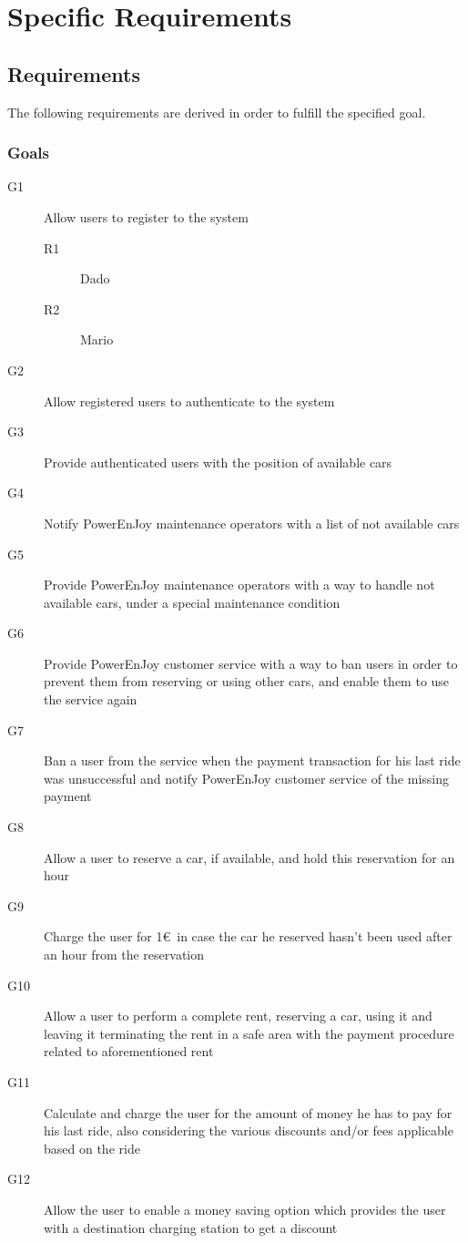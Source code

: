 \section{Specific Requirements}

\subsection{Requirements}
The following requirements are derived in order to fulfill the specified goal.
\subsubsection{Goals}
	\begin{description}
		\item[G1] Allow users to register to the system
		\begin{description}
			\item[R1] Dado
			\item[R2] Mario
		\end{description}
		\item[G2] Allow registered users to authenticate to the system
		\item[G3] Provide authenticated users with the position of available cars
		\item[G4] Notify PowerEnJoy maintenance operators with a list of not available cars 
		\item[G5] Provide PowerEnJoy maintenance operators with a way to handle not available cars, under a special maintenance condition
		\item[G6] Provide PowerEnJoy customer service with a way to ban users in order to prevent them from reserving or using other cars, and enable them to use the service again
		\item[G7] Ban a user from the service when the payment transaction for his last ride was unsuccessful and notify PowerEnJoy customer service of the missing payment
		\item[G8] Allow a user to reserve a car, if available, and hold this reservation for an hour
		\item[G9] Charge the user for 1\euro\ in case the car he reserved hasn't been used after an hour from the reservation
		\item[G10] Allow a user to perform a complete rent, reserving a car, using it and leaving it terminating the rent in a safe area with the payment procedure related to aforementioned rent
		\item[G11] Calculate and charge the user for the amount of money he has to pay for his last ride, also considering the various discounts and/or fees applicable based on the ride
		\item[G12] Allow the user to enable a money saving option which provides the user with a destination charging station to get a discount
	\end{description}

